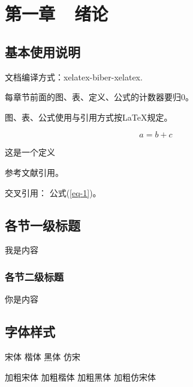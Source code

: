 \pagestyle{fancy}
\fancyhead{} %
\fancyfoot[C]{\thepage}%
\renewcommand{\headrulewidth}{1pt} %
\renewcommand{\footrulewidth}{0pt}

{}
\section*{第一章~~绪论}
\setcounter{section}{1} \setcounter{subsection}{0} 
\setcounter{table}{0} \setcounter{figure}{0} \setcounter{equation}{0} \setcounter{definition}{0}

\subsection{基本使用说明}
文档编译方式：xelatex-biber-xelatex.

每章节前面的图、表、定义、公式的计数器要归0。

图、表、公式使用与引用方式按\LaTeX 规定。

\begin{equation}
    a=b+c \label{eq-1}
\end{equation}

\begin{definition}
    这是一个定义
\end{definition}

参考文献引用\cite{kai1979prospect}。

交叉引用： 公式(\ref{eq-1})。

\subsection{各节一级标题}
我是内容

\subsubsection{各节二级标题}
你是内容


\subsection{字体样式}

{\song 宋体 \kai 楷体 \hei 黑体 \fs 仿宋}

{\tbf 加粗宋体 \kaitib 加粗楷体 \heitib 加粗黑体 \fangsongti 加粗仿宋体}

\newpage